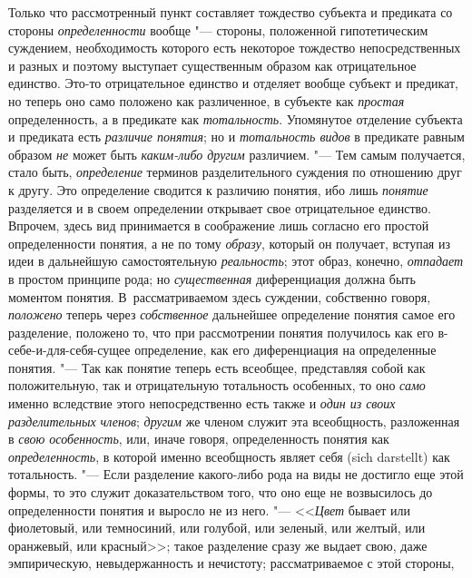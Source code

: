 {Только что рассмотренный пункт составляет тождество субъекта и
предиката со стороны {\em определенности}
вообще "--- стороны, положенной гипотетическим
суждением, необходимость которого есть некоторое тождество непосредственных
и разных и поэтому выступает существенным образом как отрицательное
единство. Это-то отрицательное единство и отделяет вообще субъект и
предикат, но теперь оно само положено как различенное, в субъекте как
{\em простая} определенность, а в предикате как {\em тотальность}.
Упомянутое отделение субъекта и предиката есть {\em различие понятия};
но и {\em тотальность видов} в предикате равным образом {\em не} может быть
{\em каким-либо другим} различием. "--- Тем самым получается, стало быть,
{\em определение} терминов разделительного суждения по отношению друг к другу.
Это определение сводится к различию понятия, ибо лишь {\em понятие} разделяется
и в своем определении открывает свое отрицательное единство. Впрочем, здесь
вид принимается в соображение лишь согласно его простой определенности
понятия, а не по тому {\em образу}, который он получает, вступая из идеи
в дальнейшую самостоятельную {\em реальность}; этот образ, конечно,
{\em отпадает} в простом принципе рода; но {\em существенная}
диференциация должна быть моментом понятия. В~рассматриваемом здесь
суждении, собственно говоря, {\em положено} теперь через {\em собственное}
дальнейшее определение понятия самое его разделение, положено
то, что при рассмотрении понятия получилось как его в-себе-и-для-себя-сущее
определение, как его диференциация на определенные понятия. "---
Так как понятие теперь есть всеобщее, представляя собой как
положительную, так и отрицательную тотальность особенных, то оно
{\em само} именно вследствие этого непосредственно есть также и
{\em один из своих разделительных членов}; {\em другим} же
членом служит эта всеобщность, разложенная в {\em свою особенность},
или, иначе говоря, определенность понятия как {\em определенность}, в
которой именно всеобщность являет себя (sich darstellt) как
тотальность. "--- Если разделение какого-либо рода на виды не
достигло еще этой формы, то это служит доказательством того, что оно еще не
возвысилось до определенности понятия и выросло не из него. "---
<<{\em Цвет} бывает или фиолетовый, или темносиний, или голубой, или
зеленый, или желтый, или оранжевый, или красный>>;
такое разделение сразу же выдает свою, даже
эмпирическую, невыдержанность и нечистоту; рассматриваемое с этой стороны,
}
